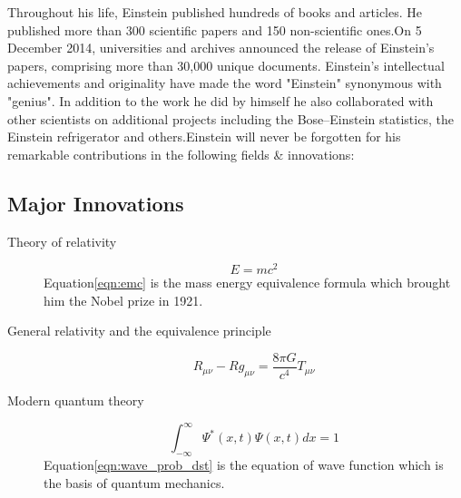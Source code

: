 \documentclass{article}
\begin{document}
Throughout his life, Einstein published hundreds of books and articles. He published more than 300 scientific papers and 150 non-scientific ones.On 5 December 2014, universities and archives announced the release of Einstein's papers, comprising more than 30,000 unique documents. Einstein's intellectual achievements and originality have made the word "Einstein" synonymous with "genius". In addition to the work he did by himself he also collaborated with other scientists on additional projects including the Bose–Einstein statistics, the Einstein refrigerator and others.Einstein will never be forgotten for his remarkable contributions in the following fields \& innovations:

\subsection{Major Innovations}
\begin{description}

\item[Theory of relativity]
\begin{equation}
    E = mc^2
\label{eqn:emc}
\end{equation}
Equation\eqref{eqn:emc} is the mass energy equivalence formula which brought him the Nobel prize in 1921.

\item [General relativity and the equivalence principle]
\begin{equation*}
    R _{\mu \nu} - R g _{\mu \nu} = \frac{8 \pi G}{c^4} T _{\mu \nu}
\end{equation*}

\item [Modern quantum theory]
\begin{equation}
     \int_{-\infty}^{\infty} \Psi^ * (x,t) \Psi (x,t) dx = 1 
    \label{eqn:wave_prob_dst}
\end{equation}
    Equation\eqref{eqn:wave_prob_dst} is the equation of wave function which is the basis of quantum mechanics.
\end{description}
\end{document}
